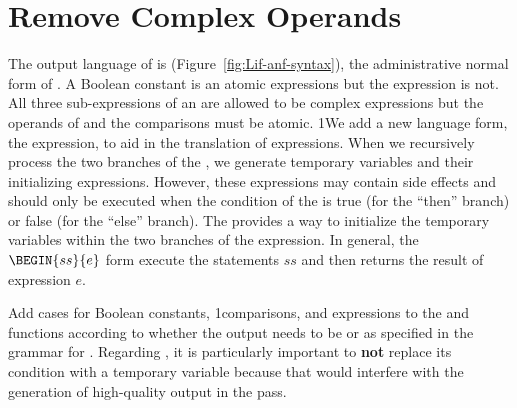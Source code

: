 \documentclass[7x10,nocrop]{TimesAPriori_MIT}%
\def\pythonEd{1}
\def\edition{1}
\newcommand{\python}[1]{{\if\edition\pythonEd #1\fi}}
\begin{document}
\section{Remove Complex Operands}
\label{sec:remove-complex-opera-Lif}

The output language of  is
\LangIfANF{} (Figure~\ref{fig:Lif-anf-syntax}), the administrative
normal form of \LangIf{}.  A Boolean constant is an atomic expressions
but the  expression is not.  All three sub-expressions of an
 are allowed to be complex expressions but the operands of
 and the comparisons must be atomic.
%
\python{We add a new language form, the  expression, to aid
  in the translation of \code{if} expressions. When we recursively
  process the two branches of the \code{if}, we generate temporary
  variables and their initializing expressions. However, these
  expressions may contain side effects and should only be executed
  when the condition of the \code{if} is true (for the ``then''
  branch) or false (for the ``else'' branch). The \code{Begin} provides
  a way to initialize the temporary variables within the two branches
  of the \code{if} expression.  In general, the $\BEGIN{ss}{e}$
  form execute the statements $ss$ and then returns the result of
  expression $e$.}

Add cases for Boolean constants, \python{comparisons,} and 
expressions to the  and  functions
according to whether the output needs to be \Exp{} or \Atm{} as
specified in the grammar for \LangIfANF{}.  Regarding , it is
particularly important to \textbf{not} replace its condition with a
temporary variable because that would interfere with the generation of
high-quality output in the  pass.


\newcommand{\LifMonadASTPython}{
\begin{array}{rcl}
\Atm &::=& \BOOL{\itm{bool}}\\
\Exp &::=& \CMP{\Atm}{\itm{cmp}}{\Atm} \MID \IF{\Exp}{\Exp}{\Exp} \\
  &\MID& \BEGIN{\Stmt^{*}}{\Exp}\\
\Stmt{} &::=& \IFSTMT{\Exp}{\Stmt^{*}}{\Stmt^{*}}
\end{array}
}
\end{document}
